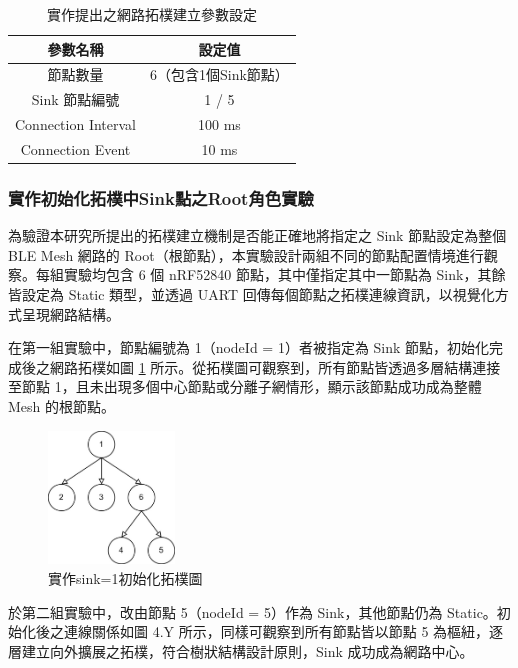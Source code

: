 \begin{ZhChapter}
\begin{table}[H]
    \centering
    \caption{實作提出之網路拓樸建立參數設定}
    \label{tab: 實作提出之網路拓樸建立參數設定}
    \begin{tabular}{|c|c|}
        \hline
        參數名稱 & 設定值 \\
        \hline
        節點數量 & 6（包含1個Sink節點） \\
        \hline
        Sink 節點編號 & 1 / 5 \\
        \hline
        Connection Interval & 100 ms \\
        \hline
        Connection Event & 10 ms \\
        \hline
    \end{tabular}
\end{table}

\subsubsection{實作初始化拓樸中Sink點之Root角色實驗}
為驗證本研究所提出的拓樸建立機制是否能正確地將指定之 Sink 節點設定為整個 BLE Mesh 網路的 Root（根節點），本實驗設計兩組不同的節點配置情境進行觀察。每組實驗均包含 6 個 nRF52840 節點，其中僅指定其中一節點為 Sink，其餘皆設定為 Static 類型，並透過 UART 回傳每個節點之拓樸連線資訊，以視覺化方式呈現網路結構。

在第一組實驗中，節點編號為 1（nodeId = 1）者被指定為 Sink 節點，初始化完成後之網路拓樸如圖 \ref{fig: 實作sink=1初始化拓樸圖} 所示。從拓樸圖可觀察到，所有節點皆透過多層結構連接至節點 1，且未出現多個中心節點或分離子網情形，顯示該節點成功成為整體 Mesh 的根節點。

\begin{figure}[H]
    \centering
    \includegraphics[width = 0.3\textwidth]{image/實作sink=1初始化拓樸圖.jpg}
    \caption{實作sink=1初始化拓樸圖}
    \label{fig: 實作sink=1初始化拓樸圖}
\end{figure}

於第二組實驗中，改由節點 5（nodeId = 5）作為 Sink，其他節點仍為 Static。初始化後之連線關係如圖 4.Y 所示，同樣可觀察到所有節點皆以節點 5 為樞紐，逐層建立向外擴展之拓樸，符合樹狀結構設計原則，Sink 成功成為網路中心。


\end{ZhChapter}

